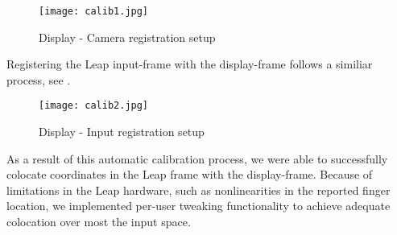 \begin{figure}
    \centering
    \texttt{[image: calib1.jpg]}
    \caption{Display - Camera registration setup}
    \label{fig:calib1}
\end{figure}

Registering the Leap input-frame with the display-frame follows a similiar process, see .

\begin{figure}
    \centering
    \texttt{[image: calib2.jpg]}
    \caption{Display - Input registration setup}
    \label{fig:calib2}
\end{figure}

As a result of this automatic calibration process, we were able to
successfully colocate coordinates in the Leap frame with the display-frame.
Because of limitations in the Leap hardware, such as nonlinearities in the
reported finger location, we implemented per-user tweaking functionality to
achieve adequate colocation over most the input space.
